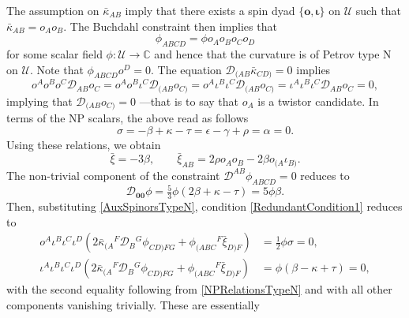\documentclass[10pt,a4paper]{article}
\newcommand\omicron{o}
\theoremstyle{plain}
\begin{document}
The assumption on $\bar{\kappa}_{AB}$ imply that there exists a spin
dyad $\lbrace \bm\omicron, \bm\iota\rbrace$ on $\mathcal{U}$ such that
$\bar{\kappa}_{AB}=\omicron_A\omicron_B$. The Buchdahl constraint then
implies that
\begin{equation}
\phi_{ABCD}=\phi \omicron_A\omicron_B\omicron_C\omicron_D
\end{equation}
for some scalar field $\phi:\mathcal{U}\rightarrow\mathbb{C}$ and
hence that the curvature is of Petrov type N on $\mathcal{U}$. Note
that $\phi_{ABCD}\omicron^D=0$. The equation
$\mathcal{D}_{(AB}\bar{\kappa}_{CD)}=0$ implies
\begin{equation*}
 \omicron^A \omicron^B \omicron^C \mathcal{D}_{AB}\omicron_C=
 \omicron^A \omicron^B \iota^C\mathcal{D}_{(AB}\omicron_{C)}=
 \omicron^A \iota^B \iota^C\mathcal{D}_{(AB}\omicron_{C)}= \iota^A
 \iota^B \iota^C\mathcal{D}_{AB}\omicron_{C}=0,
\end{equation*}
implying that $\mathcal{D}_{(AB}\omicron_{C)}=0$ ---that is to say
that $\omicron_A$ is a twistor candidate. In terms of the NP scalars,
the above read as follows
\begin{equation}\label{NPRelationsTypeN} 
\sigma=- \beta + \kappa - \tau=\epsilon - \gamma + \rho=\alpha=0.
\end{equation}	
Using these relations, we obtain
\begin{equation}\label{AuxSpinorsTypeN}
 \bar{\xi} = -3\beta,\qquad \bar{\xi}_{AB} = 2\rho o_Ao_B - 2\beta
 o_{(A}\iota_{B)}.
\end{equation}
The non-trivial component of the constraint
$\mathcal{D}^{AB}\phi_{ABCD}=0$ reduces to
\begin{equation}
 \mathcal{D}_{\bm0\bm0}\phi = \tfrac{5}{3}\phi (2\beta + \kappa -
 \tau)=5\phi\beta.\label{TypeNweylConstraint}
\end{equation}
Then, substituting \eqref{AuxSpinorsTypeN}, condition
\eqref{RedundantCondition1} reduces to
\begin{align*}
\omicron^A \iota^B \iota^C \iota^D
\left(2\bar{\kappa}_{(A}{}^{F}\mathcal{D}_{B}{}^{G}\phi_{CD)FG} +
\phi_{(ABC}{}^{F}\bar{\xi}_{D)F}\right) &=\tfrac{1}{2}\phi\sigma
=0,\\ \iota^A\iota^B \iota^C \iota^D
\left(2\bar{\kappa}_{(A}{}^{F}\mathcal{D}_{B}{}^{G}\phi_{CD)FG} +
\phi_{(ABC}{}^{F}\bar{\xi}_{D)F}\right) &=\phi(\beta - \kappa + \tau)
= 0,
\end{align*}
with the second equality following from \eqref{NPRelationsTypeN} and
with all other components vanishing trivially. These are essentially
\end{document}
